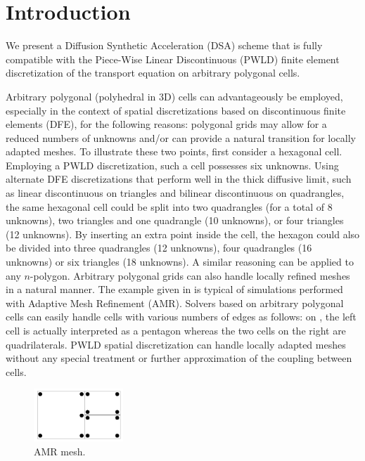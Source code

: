 \section{Introduction}

We present a Diffusion Synthetic Acceleration (DSA) scheme
that is fully compatible with the Piece-Wise Linear Discontinuous (PWLD) finite
element discretization of the transport equation on arbitrary
polygonal cells. 

Arbitrary polygonal (polyhedral in 3D) cells can advantageously be employed, especially
in the context of spatial discretizations based on discontinuous finite elements (DFE),
for the following reasons:
polygonal grids may allow for a reduced numbers of unknowns and/or can provide a natural
transition for locally adapted meshes. To illustrate these two points, first consider
a hexagonal cell. Employing a PWLD discretization, such a cell possesses six unknowns. Using
alternate DFE discretizations that perform well in the thick diffusive limit, such as 
linear discontinuous on triangles and bilinear discontinuous on quadrangles, the same 
hexagonal cell could be split into two quadrangles (for a total of 8 unknowns), two 
triangles and one quadrangle (10 unknowns), or four triangles (12 unknowns). By inserting an 
extra point inside the cell, the hexagon could also be divided into three quadrangles 
(12 unknowns), four quadrangles (16 unknowns) or six triangles (18 unknowns). A 
similar reasoning can be applied to any $n$-polygon. Arbitrary polygonal grids can 
also handle locally refined meshes in a natural manner. The example given
in  is typical of simulations performed with Adaptive Mesh 
Refinement (AMR). Solvers based on arbitrary polygonal cells can easily handle cells 
with various numbers of edges as follows: on , the left cell is actually interpreted 
as a pentagon whereas the two cells on the right are quadrilaterals. PWLD spatial
discretization can handle locally adapted meshes without any special treatment 
or further approximation of the coupling between cells.
\begin{figure}[H]
   \centering
   \includegraphics[width=0.3\textwidth]{amr.png}
   \caption{AMR mesh.}
   \label{fig_amr}
\end{figure}


